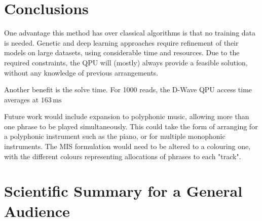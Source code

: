 \documentclass[aps,pra,10pt,twocolumn]{revtex4-2}
\begin{document}
\section{Conclusions}

One advantage this method has over classical algorithms is that no training data is needed. Genetic and deep learning approaches require refinement of their models on large datasets, using considerable time and resources. Due to the required constraints, the QPU will (mostly) always provide a feasible solution, without any knowledge of previous arrangements.

Another benefit is the solve time. For 1000 reads, the D-Wave QPU access time averages at $163\,\textrm{ms}$

Future work would include expansion to polyphonic music, allowing more than one phrase to be played simultaneously. This could take the form of arranging for a polyphonic instrument such as the piano, or for multiple monophonic instruments. The MIS formulation would need to be altered to a colouring one, with the different colours representing allocations of phrases to each "track".

\nocite{*}


\clearpage

\onecolumngrid %

\section*{Scientific Summary for a General Audience}

\lipsum[1]
\end{document}
